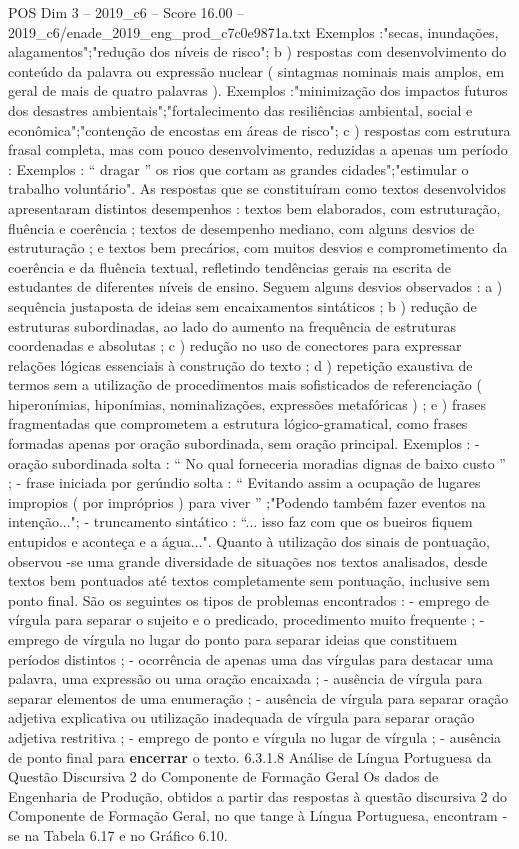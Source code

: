 \begin{textsample}{POS Dim 3 – 2019\_c6 – Score 16.00 – 2019\_c6/enade\_2019\_eng\_prod\_c7c0e9871a.txt}
Exemplos :"secas, inundações, alagamentos";"redução dos níveis de risco"; b ) respostas com desenvolvimento do conteúdo da palavra ou expressão nuclear ( sintagmas nominais mais amplos, em geral de mais de quatro palavras ).
Exemplos :"minimização dos impactos futuros dos desastres ambientais";"fortalecimento das resiliências ambiental, social e econômica";"contenção de encostas em áreas de risco"; c ) respostas com estrutura frasal completa, mas com pouco desenvolvimento, reduzidas a apenas um período : Exemplos : “ dragar ” os rios que cortam as grandes cidades";"estimular o trabalho voluntário".
As respostas que se constituíram como textos desenvolvidos apresentaram distintos desempenhos : textos bem elaborados, com estruturação, fluência e coerência ; textos de desempenho mediano, com alguns desvios de estruturação ; e textos bem precários, com muitos desvios e comprometimento da coerência e da fluência textual, refletindo tendências gerais na escrita de estudantes de diferentes níveis de ensino.
Seguem alguns desvios observados : a ) sequência justaposta de ideias sem encaixamentos sintáticos ; b ) redução de estruturas subordinadas, ao lado do aumento na frequência de estruturas coordenadas e absolutas ; c ) redução no uso de conectores para expressar relações lógicas essenciais à construção do texto ; d ) repetição exaustiva de termos sem a utilização de procedimentos mais sofisticados de referenciação ( hiperonímias, hiponímias, nominalizações, expressões metafóricas ) ; e ) frases fragmentadas que comprometem a estrutura lógico-gramatical, como frases formadas apenas por oração subordinada, sem oração principal.
Exemplos : - oração subordinada solta : “ No qual forneceria moradias dignas de baixo custo ” ; - frase iniciada por gerúndio solta : “ Evitando assim a ocupação de lugares impropios ( por impróprios ) para viver ” ;"Podendo também fazer eventos na intenção..."; - truncamento sintático : “... isso faz com que os bueiros fiquem entupidos e aconteça e a água...".
Quanto à utilização dos sinais de pontuação, observou -se uma grande diversidade de situações nos textos analisados, desde textos bem pontuados até textos completamente sem pontuação, inclusive sem ponto final.
São os seguintes os tipos de problemas encontrados : - emprego de vírgula para separar o sujeito e o predicado, procedimento muito frequente ; - emprego de vírgula no lugar do ponto para separar ideias que constituem períodos distintos ; - ocorrência de apenas uma das vírgulas para destacar uma palavra, uma expressão ou uma oração encaixada ; - ausência de vírgula para separar elementos de uma enumeração ; - ausência de vírgula para separar oração adjetiva explicativa ou utilização inadequada de vírgula para separar oração adjetiva restritiva ; - emprego de ponto e vírgula no lugar de vírgula ; - ausência de ponto final para \textbf{encerrar} o texto. 6.3.1.8 Análise de Língua Portuguesa da Questão Discursiva 2 do Componente de Formação Geral Os dados de Engenharia de Produção, obtidos a partir das respostas à questão discursiva 2 do Componente de Formação Geral, no que tange à Língua Portuguesa, encontram -se na Tabela 6.17 e no Gráfico 6.10.

\end{textsample}
